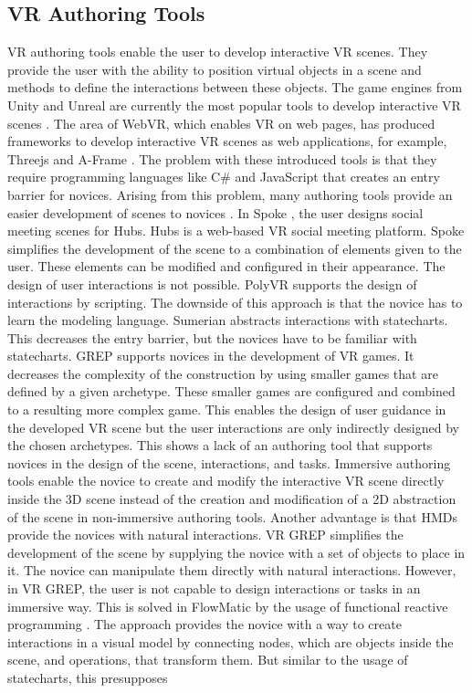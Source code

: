 \documentclass[conference]{IEEEtran}
\begin{document}
\subsection{VR Authoring Tools}
\ac{VR} authoring tools enable the user to develop interactive \ac{VR} scenes. They provide the user with the ability to position virtual objects in a scene and methods to define the interactions between these objects. The game engines from Unity \cite{UnityWebpage} and Unreal \cite{UnrealWebpage} are currently the most popular tools to develop interactive \ac{VR} scenes \cite{UnityUnrealPopular}. The area of WebVR, which enables \ac{VR} on web pages, has produced frameworks to develop interactive \ac{VR} scenes as web applications, for example, Threejs \cite{ThreejsWebpage} and A-Frame \cite{AFrameWebpage}. The problem with these introduced tools is that they require programming languages like C\# and JavaScript that creates an entry barrier for novices. Arising from this problem, many authoring tools provide an easier development of scenes to novices \cite{SpokeWebpage, SumerianWebpage, EUDGames-GREP, XRT, PolyVR}. In Spoke \cite{SpokeWebpage}, the user designs social meeting scenes for Hubs\cite{HubsWebpage}. Hubs is a web-based VR social meeting platform. Spoke simplifies the development of the scene to a combination of elements given to the user. These elements can be modified and configured in their appearance. The design of user interactions is not possible. PolyVR \cite{PolyVR} supports the design of interactions by scripting. The downside of this approach is that the novice has to learn the modeling language. Sumerian \cite{SumerianWebpage} abstracts interactions with statecharts. This decreases the entry barrier, but the novices have to be familiar with statecharts. \ac{GREP} \cite{EUDGames-GREP} supports novices in the development of \ac{VR} games. It decreases the complexity of the construction by using smaller games that are defined by a given archetype. These smaller games are configured and combined to a resulting more complex game. This enables the design of user guidance in the developed VR scene but the user interactions are only indirectly designed by the chosen archetypes. This shows a lack of an authoring tool that supports novices in the design of the scene, interactions, and tasks. Immersive authoring tools enable the novice to create and modify the interactive \ac{VR} scene directly inside the 3D scene instead of the creation and modification of a 2D abstraction of the scene in non-immersive authoring tools. Another advantage is that \ac{HMDs} provide the novices with natural interactions. VR GREP \cite{ImmersiveGREP} simplifies the development of the scene by supplying the novice with a set of objects to place in it. The novice can manipulate them directly with natural interactions. However, in VR GREP, the user is not capable to design interactions or tasks in an immersive way. This is solved in FlowMatic \cite{FlowMatic} by the usage of functional reactive programming \cite{FRP}. The approach provides the novice with a way to create interactions in a visual model by connecting nodes, which are objects inside the scene, and operations, that transform them. But similar to the usage of statecharts, this presupposes 
\end{document}
